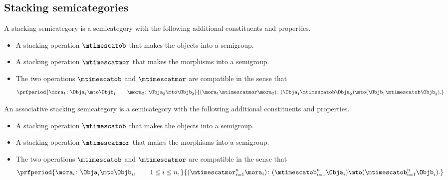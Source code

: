 \subsection{Stacking semicategories}

\begin{ctdefinition}
	\label{def:simple-stacking-semi-cat}
	A stacking semicategory is a semicategory with the following additional constituents and properties.

	\constit
	\begin{itemize}
		\item A stacking operation $\mtimescatob$ that makes the objects into a semigroup.
		\item A stacking operation $\mtimescatmor$ that makes the morphisms into a semigroup.
	\end{itemize}

	\condit
	\begin{itemize}
		\item The two operations $\mtimescatob$ and $\mtimescatmor$ are compatible in the sense that
		      \begin{equation}
			      \prfperiod{
				      \mora_1 \colon \Obja_1 \mto \Objb_1
				      \qquad
				      \mora_2 \colon \Obja_2 \mto \Objb_2
			      }{
				      ( \mora_1 \mtimescatmor \mora_2 )\colon( \Obja_1 \mtimescatob  \Obja_2) \mto ( \Objb_1 \mtimescatob \Objb_2).
			      }
		      \end{equation}
	\end{itemize}
\end{ctdefinition}

\begin{ctdefinition}
	\label{def:stacking-semi-cat}
	An associative stacking semicategory is a semicategory with the following additional constituents and properties.

	\constit
	\begin{itemize}
		\item A stacking operation $\mtimescatob$ that makes the objects into a semigroup.
		\item A stacking operation $\mtimescatmor$ that makes the morphisms into a semigroup.
	\end{itemize}

	\condit
	\begin{itemize}
		\item The two operations $\mtimescatob$ and $\mtimescatmor$ are compatible in the sense that
		      \begin{equation}
			      \prfperiod{
				      \mora_i \colon \Obja_i \mto \Objb_i, \qquad 1 \leq i \leq n,
			      }{
				      ( \mtimescatmor_{i=1}^n \mora_i )\colon( \mtimescatob_{i=1}^n \Obja_i) \mto (\mtimescatob_{i=1}^n \Objb_i).
			      }
		      \end{equation}
	\end{itemize}
\end{ctdefinition}

